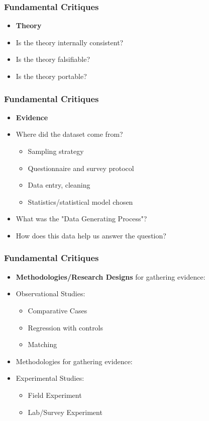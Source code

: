 \documentclass[xcolor=x11names,compress]{beamer}\usepackage[]{graphicx}\usepackage[]{xcolor}
\renewcommand{\(}{\begin{columns}}
\renewcommand{\)}{\end{columns}}
\newcommand{\<}[1]{\begin{column}{#1}}
\renewcommand{\>}{\end{column}}
\begin{document}
\begin{frame}
\frametitle{Fundamental Critiques}
\begin{itemize}
\item \textbf{Theory}
\pause
\item Is the theory internally consistent?
\pause
\item Is the theory falsifiable?
\pause
\item Is the theory portable?
\end{itemize}
\end{frame}

\begin{frame}
\frametitle{Fundamental Critiques}
\begin{itemize}
\item \textbf{Evidence}
\pause
\item Where did the dataset come from?
\pause
\begin{itemize}
\item Sampling strategy
\pause
\item Questionnaire and survey protocol
\pause
\item Data entry, cleaning
\pause
\item Statistics/statistical model chosen
\pause
\end{itemize}
\item What was the "Data Generating Process"?
\item How does this data help us answer the question?
\end{itemize}
\end{frame}

\begin{frame}
\frametitle{Fundamental Critiques}
\begin{itemize}
\item \textbf{Methodologies/Research Designs} for gathering evidence:
\pause
\item Observational Studies:
\begin{itemize}
\item Comparative Cases
\pause
\item Regression with controls
\pause
\item Matching
\end{itemize}
\end{itemize}
\begin{itemize}
\item Methodologies for gathering evidence:
\pause
\item Experimental Studies:
\pause
\begin{itemize}
\item Field Experiment
\pause
\item Lab/Survey Experiment
\end{itemize}
\end{itemize}
\end{frame}
\end{document}
